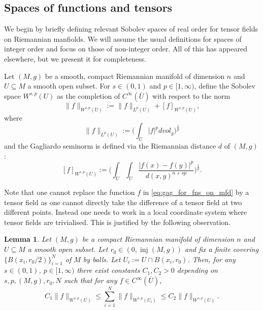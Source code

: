 \documentclass[12pt]{article}
\theoremstyle{plain}
\newtheorem{lemma}[theorem]{Lemma}
\numberwithin{equation}{section}
\begin{document}
    \subsection{Spaces of functions and tensors} \label{sec:func_spaces}
    
    We begin by briefly defining relevant Sobolev spaces of real order for tensor fields on Riemannian manfiolds. We will assume the usual definitions for spaces of integer order and focus on those of non-integer order. All of this has appeared elsewhere, but we present it for completeness.
    
    Let $(M,g)$ be a smooth, compact Riemannian manifold of dimension $n$ and $U \subseteq M$ a smooth open subset. For $s \in (0,1)$ and $p \in [1,\infty)$, define the Sobolev space $W^{s,p}(U)$ as the completion of $C^\infty(\overline U)$ with respect to the norm
    \begin{equation*}
        \|f\|_{W^{s,p}(U)} := \|f\|_{L^p(U)} + [f]_{W^{s,p}(U)},
    \end{equation*}
    where
    \begin{equation*}
        \|f\|_{L^p(U)} := \Big( \int_U |f|^p dvol_g \Big)^{\frac1p}
    \end{equation*}
    and the Gagliardo seminorm is defined via the Riemannian distance $d$ of $(M,g)$:
    \begin{equation} \label{eq:gag_for_fns_on_mfd}
        [f]_{W^{s,p}(U)} := \Big( \int_U \int_U \frac{|f(x)-f(y)|^p}{d(x,y)^{n+sp}}\Big)^{\frac1p}.
    \end{equation}

    Note that one cannot replace the function $f$ in \eqref{eq:gag_for_fns_on_mfd} by a tensor field as one cannot directly take the difference of a tensor field at two different points. Instead one needs to work in a local coordinate system where tensor fields are trivialised. This is justified by the following observation.

    \begin{lemma}
    \label{lem:WspNE}
        Let $(M,g)$ be a compact Riemannian manifold of dimension $n$ and $U \subseteq M$ a smooth open subset. Let $r_0 \in (0,\operatorname{inj}(M,g))$ and fix a finite covering $\{B(x_i, r_0/2)\}_{i=1}^N$ of $M$ by balls. Let $U_i := U \cap B(x_i, r_0)$. Then, for any $s \in (0,1)$, $p \in [1,\infty)$ there exist constants $C_1, C_2 > 0$ depending on $s,p, (M, g), r_0, N$ such that for any $f \in C^\infty(\overline U)$,
    \begin{equation*}
       C_1 \|f\|_{W^{s,p}(U)} \leq  \sum_{i=1}^N \|f\|_{W^{s,p}(U_i)} \leq C_2 \|f\|_{W^{s,p}(U)}.
    \end{equation*}
    \end{lemma}
\end{document}
